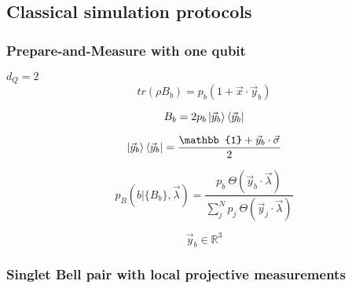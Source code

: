 \subsection{Classical simulation protocols}
\subsubsection{Prepare-and-Measure with one qubit}
\textit{$d_Q=2$}
\begin{equation}
tr(\rho B_b) = p_b(1 + \vec{x} \cdot \vec{y}_b) 
\end{equation}

\begin{equation}
B_b = 2p_b\ket{\vec{y}_b}\bra{\vec{y}_b}
\end{equation}

\begin{equation}
\ket{\vec{y}_b}\bra{\vec{y}_b} = \frac{\mathbb{1} + \vec{y}_b \cdot \vec{\sigma}}{2}
\end{equation}

\begin{equation}
p_B(b|\{B_b\},\vec{\lambda}) = \frac{p_b\ \Theta(\vec{y}_b \cdot \vec{\lambda})}{\sum_{j}^{N}p_j\ \Theta(\vec{y}_j \cdot \vec{\lambda})}
\end{equation}

\[\vec{y}_b \in \mathbb{R}^{3}\]



\subsubsection{Singlet Bell pair with local projective measurements}

